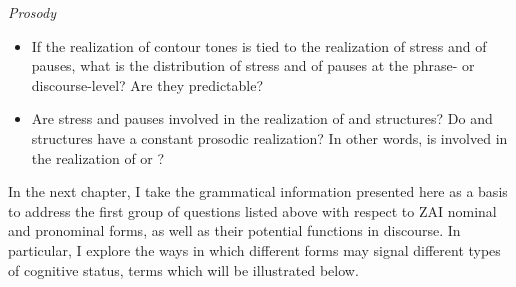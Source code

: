 \noindent \textit{Prosody}
\begin{itemize}
\item If the realization of contour tones is tied to the realization of stress and of pauses, what is the distribution of stress and of pauses at the phrase- or discourse-level? Are they predictable? 
\item Are stress and pauses involved in the realization of  and  structures? Do  and  structures have a constant prosodic realization? In other words, is  involved in the realization of  or ?
\end{itemize}


In the next chapter, I take the grammatical information presented here as a basis to address the first group of questions listed above with respect to ZAI nominal and pronominal forms, as well as their potential functions in discourse. In particular, I explore the ways in which different forms may signal different types of cognitive status, terms which will be illustrated below. 

